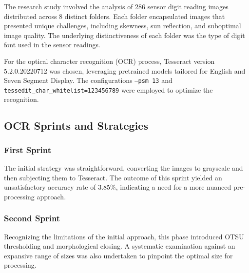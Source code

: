 The research study involved the analysis of 286 sensor digit reading images distributed across 8 distinct folders. Each folder encapsulated images that presented unique challenges, including skewness, sun reflection, and suboptimal image quality. The underlying distinctiveness of each folder was the type of digit font used in the sensor readings.

For the optical character recognition (OCR) process, Tesseract version 5.2.0.20220712 was chosen, leveraging pretrained models tailored for English and Seven Segment Display. The configurations \texttt{--psm 13} and \texttt{tessedit\_char\_whitelist=123456789} were employed to optimize the recognition.

\subsection{OCR Sprints and Strategies}

\subsubsection{First Sprint}
The initial strategy was straightforward, converting the images to grayscale and then subjecting them to Tesseract. The outcome of this sprint yielded an unsatisfactory accuracy rate of 3.85\%, indicating a need for a more nuanced pre-processing approach.

\subsubsection{Second Sprint}
Recognizing the limitations of the initial approach, this phase introduced OTSU thresholding and morphological closing. A systematic examination against an expansive range of sizes was also undertaken to pinpoint the optimal size for processing.

